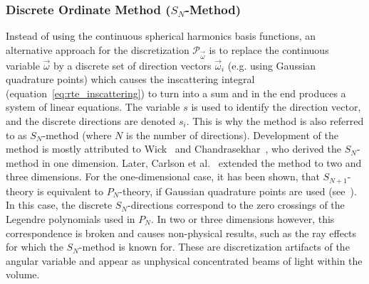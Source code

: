\subsubsection*{Discrete Ordinate Method ($S_N$-Method)}
Instead of using the continuous spherical harmonics basis functions, an alternative approach for the discretization $\mathcal{P}_{\vec{\omega}}$ is to replace the continuous variable $\vec{\omega}$ by a discrete set of direction vectors $\vec{\omega}_i$ (e.g. using Gaussian quadrature points) which causes the inscattering integral (equation~\ref{eq:rte_inscattering}) to turn into a sum and in the end produces a system of linear equations. The variable $s$ is used to identify the direction vector, and the discrete directions are denoted $s_i$. This is why the method is also referred to as $S_N$-method (where $N$ is the number of directions). Development of the method is mostly attributed to Wick~\cite{Wick43} and Chandrasekhar~\cite{Chandrasekhar60}, who derived the $S_N$-method in one dimension. Later, Carlson et al.~\cite{Carlson61} extended the method to two and three dimensions. For the one-dimensional case, it has been shown, that $S_{N+1}$-theory is equivalent to $P_N$-theory, if Gaussian quadrature points are used (see~\cite{Cullen01}). In this case, the discrete $S_N$-directions correspond to the zero crossings of the Legendre polynomials used in $P_N$. In two or three dimensions however, this correspondence is broken and causes non-physical results, such as the ray effects for which the $S_N$-method is known for. These are discretization artifacts of the angular variable and appear as unphysical concentrated beams of light within the volume.
